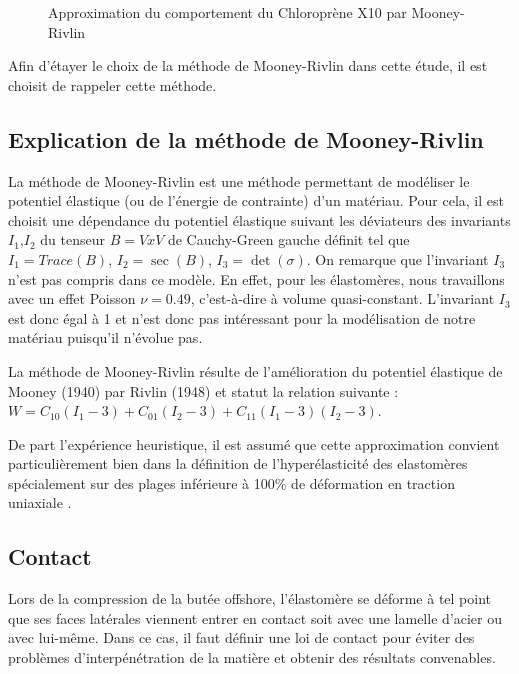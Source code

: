 ﻿\documentclass{article}
\begin{document}
\begin{figure}
\caption{Approximation du comportement du Chloroprène X10 par Mooney-Rivlin}
\label{fig:plot_donnees_essais}
\end{figure}

Afin d'étayer le choix de la méthode de Mooney-Rivlin dans cette étude, il est choisit de rappeler cette méthode.

\subsection{Explication de la méthode de Mooney-Rivlin}
La méthode de Mooney-Rivlin est une méthode permettant de modéliser le potentiel élastique (ou de l'énergie de contrainte) d'un matériau. Pour cela, il est choisit une dépendance du potentiel élastique suivant les déviateurs des invariants $I_1$,$I_2$ du tenseur $B = V x V$ de Cauchy-Green gauche définit tel que $I_1 = Trace(B)$, $I_2 = \sec(B)$, $I_3=\det(\sigma)$.
On remarque que l'invariant $I_3$ n'est pas compris dans ce modèle. En effet, pour les élastomères, nous travaillons avec un effet Poisson $\nu = 0.49$, c'est-à-dire à volume quasi-constant. L'invariant $I_3$ est donc égal à 1 et n'est donc pas intéressant pour la modélisation de notre matériau puisqu'il n'évolue pas.

La méthode de Mooney-Rivlin résulte de l'amélioration du potentiel élastique de Mooney (1940) par Rivlin (1948) et statut la relation suivante \cite{wiki_MR}: $W = C_10(I_1-3) + C_01(I_2-3) + C_11(I_1-3)(I_2-3)$.

De part l'expérience heuristique, il est assumé que cette approximation convient particulièrement bien dans la définition de l'hyperélasticité des elastomères spécialement sur des plages inférieure à 100\% de déformation en traction uniaxiale \cite{msc}.

\subsection{Contact}
Lors de la compression de la butée offshore, l'élastomère se déforme à tel point que ses faces latérales viennent entrer en contact soit avec une lamelle d'acier ou avec lui-même. Dans ce cas, il faut définir une loi de contact pour éviter des problèmes d'interpénétration de la matière et obtenir des résultats convenables.
\end{document}
